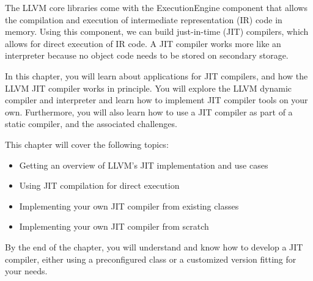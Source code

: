 
The LLVM core libraries come with the ExecutionEngine component that allows the compilation and execution of intermediate representation (IR) code in memory. Using this component, we can build just-in-time (JIT) compilers, which allows for direct execution of IR code. A JIT compiler works more like an interpreter because no object code needs to be stored on secondary storage.

In this chapter, you will learn about applications for JIT compilers, and how the LLVM JIT compiler works in principle. You will explore the LLVM dynamic compiler and interpreter and learn how to implement JIT compiler tools on your own. Furthermore, you will also learn how to use a JIT compiler as part of a static compiler, and the associated challenges.

This chapter will cover the following topics:

\begin{itemize}
\item
Getting an overview of LLVM’s JIT implementation and use cases

\item
Using JIT compilation for direct execution

\item
Implementing your own JIT compiler from existing classes

\item
Implementing your own JIT compiler from scratch
\end{itemize}

By the end of the chapter, you will understand and know how to develop a JIT compiler, either using a preconfigured class or a customized version fitting for your needs.





















